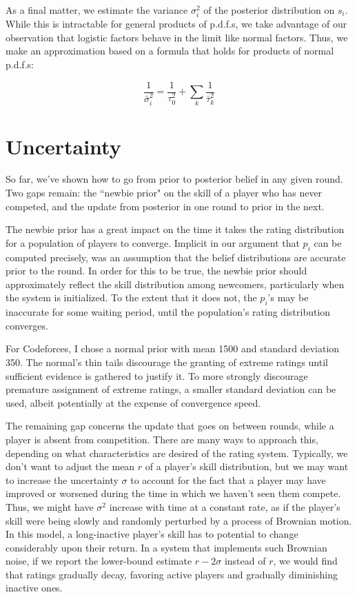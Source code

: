 \documentclass{article}
\begin{document}
As a final matter, we estimate the variance $\sigma_i^2$ of the posterior distribution on $s_i$. While this is intractable for general products of p.d.f.s, we take advantage of our observation that logistic factors behave in the limit like normal factors. Thus, we make an approximation based on a formula that holds for products of normal p.d.f.s:

\[\frac{1}{\bar\sigma_i^2} = \frac{1}{\tau_0^2} + \sum_k \frac{1}{\bar\tau_k^2}\]

\section{Uncertainty}

So far, we've shown how to go from prior to posterior belief in any given round. Two gaps remain: the ``newbie prior" on the skill of a player who has never competed, and the update from posterior in one round to prior in the next.

The newbie prior has a great impact on the time it takes the rating distribution for a population of players to converge. Implicit in our argument that $p_i$ can be computed precisely, was an assumption that the belief distributions are accurate prior to the round. In order for this to be true, the newbie prior should approximately reflect the skill distribution among newcomers, particularly when the system is initialized. To the extent that it does not, the $p_i$'s may be inaccurate for some waiting period, until the population's rating distribution converges.

For Codeforces, I chose a normal prior with mean 1500 and standard deviation 350. The normal's thin tails discourage the granting of extreme ratings until sufficient evidence is gathered to justify it. To more strongly discourage premature assignment of extreme ratings, a smaller standard deviation can be used, albeit potentially at the expense of convergence speed.

The remaining gap concerns the update that goes on between rounds, while a player is absent from competition. There are many ways to approach this, depending on what characteristics are desired of the rating system. Typically, we don't want to adjust the mean $r$ of a player's skill distribution, but we may want to increase the uncertainty $\sigma$ to account for the fact that a player may have improved or worsened during the time in which we haven't seen them compete. Thus, we might have $\sigma^2$ increase with time at a constant rate, as if the player's skill were being slowly and randomly perturbed by a process of Brownian motion. In this model, a long-inactive player's skill has to potential to change considerably upon their return. In a system that implements such Brownian noise, if we report the lower-bound estimate $r-2\sigma$ instead of $r$, we would find that ratings gradually decay, favoring active players and gradually diminishing inactive ones.
\end{document}
